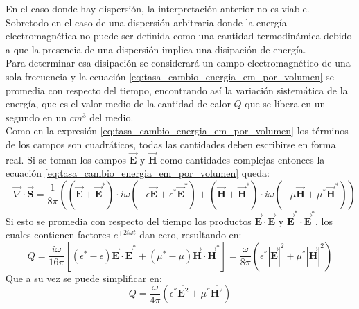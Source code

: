 \documentclass[../tesis_main_file.tex]{subfiles}
\begin{document}
En el caso donde hay dispersión, la interpretación anterior no es viable. Sobretodo en el caso de una dispersión arbitraria donde la energía electromagnética no puede ser definida como una cantidad termodinámica debido a que la presencia de una dispersión implica una disipación de energía.\\
Para determinar esa disipación se considerará un campo electromagnético de una sola frecuencia y la ecuación \ref{eq:tasa_cambio_energia_em_por_volumen} se promedia con respecto del tiempo, encontrando así la variación sistemática de la energía, que es el valor medio de la cantidad de calor $Q$ que se libera en un segundo en un $cm^3$ del medio.\\
Como en la expresión \ref{eq:tasa_cambio_energia_em_por_volumen} los términos de los campos son cuadráticos, todas las cantidades deben escribirse en forma real. Si se toman los campos $\overrightarrow{\textbf{E}}$ y $\overrightarrow{\textbf{H}}$ como cantidades complejas entonces la ecuación \ref{eq:tasa_cambio_energia_em_por_volumen} queda:
\begin{equation}
\label{eq:tasa_energia_em_compleja}
- \overrightarrow{\nabla} \cdot \overrightarrow{\textbf{S}} = \frac{1}{8\pi}\left((\overrightarrow{\textbf{E}} + \overrightarrow{\textbf{E}}^*)\cdot i\omega(-\epsilon \overrightarrow{\textbf{E}}+\epsilon ^* \overrightarrow{\textbf{E}}^*)+ (\overrightarrow{\textbf{H}} + \overrightarrow{\textbf{H}}^*)\cdot i\omega(-\mu \overrightarrow{\textbf{H}}+\mu ^* \overrightarrow{\textbf{H}}^*)\right)
\end{equation}
Si esto se promedia con respecto del tiempo los productos $\overrightarrow{\textbf{E}} \cdot \overrightarrow{\textbf{E}}$ y $\overrightarrow{\textbf{E}}^* \cdot \overrightarrow{\textbf{E}}^*$, los cuales contienen factores $e^{\mp2i\omega t}$ dan cero, resultando en:
\begin{equation}
Q =\frac{i\omega}{16\pi}\left[(\epsilon ^* -\epsilon)\overrightarrow{\textbf{E}} \cdot \overrightarrow{\textbf{E}}^* + (\mu ^* - \mu)\overrightarrow{\textbf{H}} \cdot \overrightarrow{\textbf{H}}^*\right]= \frac{\omega}{8\pi}\left(\epsilon ^{''}|\overrightarrow{\textbf{E}}|^2 + \mu ^{''}|\overrightarrow{\textbf{H}}|^2\right)
\end{equation}
Que a su vez se puede simplificar en:
\begin{equation}
\label{eq:Q_promedio_temp_dispersion}
Q =\frac{\omega}{4\pi}\left(\epsilon ^{''}\overline{\textbf{E}^2} + \mu ^{''} \overline{\textbf{H}^2}\right)
\end{equation}
\end{document}
